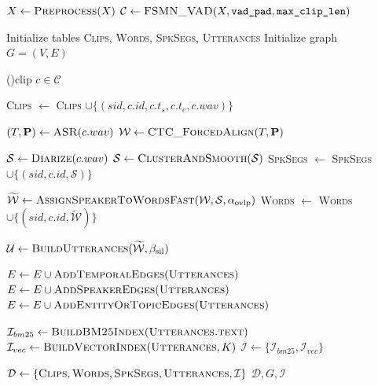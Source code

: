 \documentclass[11pt]{article}
\begin{document}
\onecolumn
\begin{algorithm}[h]
\caption{Multi-dimensional Meeting Database Construction}
\label{alg:db_construction}


$X \leftarrow \textsc{Preprocess}(X)$ 
$\mathcal{C} \leftarrow \textsc{FSMN\_VAD}(X,\texttt{vad\_pad},\texttt{max\_clip\_len})$ 

Initialize tables \textsc{Clips}, \textsc{Words}, \textsc{SpkSegs}, \textsc{Utterances}\;
Initialize graph $G=(V,E)$\;

\ForEach(){clip $c \in \mathcal{C}$}{
    \textsc{Clips} $\leftarrow$ \textsc{Clips} $\cup \{(sid,c.id,c.t_s,c.t_e,c.wav)\}$\;

    $(T,\mathbf{P}) \leftarrow \textsc{ASR}(c.wav)$ 
    $\mathcal{W} \leftarrow \textsc{CTC\_ForcedAlign}(T,\mathbf{P})$\;

    $\mathcal{S} \leftarrow \textsc{Diarize}(c.wav)$ 
    $\mathcal{S} \leftarrow \textsc{ClusterAndSmooth}(\mathcal{S})$ 
    \textsc{SpkSegs} $\leftarrow$ \textsc{SpkSegs} $\cup \{(sid,c.id,\mathcal{S})\}$\;

    $\widetilde{\mathcal{W}} \leftarrow \textsc{AssignSpeakerToWordsFast}(\mathcal{W},\mathcal{S},\alpha_{\text{ovlp}})$\;
    \textsc{Words} $\leftarrow$ \textsc{Words} $\cup \{(sid,c.id,\widetilde{\mathcal{W}})\}$\;

    $\mathcal{U} \leftarrow \textsc{BuildUtterances}(\widetilde{\mathcal{W}},\beta_{\text{sil}})$ 
}

$E \leftarrow E \cup \textsc{AddTemporalEdges}(\textsc{Utterances})$ 
$E \leftarrow E \cup \textsc{AddSpeakerEdges}(\textsc{Utterances})$ 
$E \leftarrow E \cup \textsc{AddEntityOrTopicEdges}(\textsc{Utterances})$ 

$\mathcal{I}_{bm25} \leftarrow \textsc{BuildBM25Index}(\textsc{Utterances.text})$\;
$\mathcal{I}_{vec} \leftarrow \textsc{BuildVectorIndex}(\textsc{Utterances},K)$\;
$\mathcal{I} \leftarrow \{\mathcal{I}_{bm25},\mathcal{I}_{vec}\}$\;

$\mathcal{D} \leftarrow \{\textsc{Clips},\textsc{Words},\textsc{SpkSegs},\textsc{Utterances},\mathcal{I}\}$\;
\Return $\mathcal{D},G,\mathcal{I}$\;
\end{algorithm}
\end{document}
